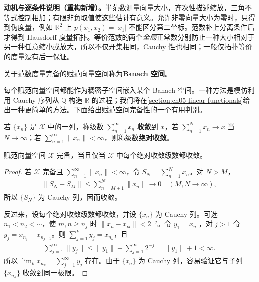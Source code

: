 \documentclass[../../main.tex]{subfiles}
\begin{document}
\begin{remark}
\textbf{动机与逐条件说明（重构新增）。}半范数测量向量大小，齐次性描述缩放，三角不等式控制相加；有限非负取值使这些估计有意义。允许非零向量大小为零时，只得到伪度量，例如 $\mathbb R^2$ 上 $p(x_1,x_2)=|x_1|$ 不能区分第二坐标。范数补上分离条件后才得到 Hausdorff 度量拓扑。等价范数的两个\emph{全局}正常数分别防止一种大小相对于另一种任意缩小或放大，所以不仅开集相同，Cauchy 性也相同；一般仅拓扑等价的度量没有后一保证。
\end{remark}
\begin{definition}[Banach 空间]\label{definition:ch05-banach-space}
关于范数度量完备的赋范向量空间称为\textbf{Banach 空间}。
\end{definition}
每个赋范向量空间都能作为稠密子空间嵌入某个 Banach 空间。一种方法是模仿利用 Cauchy 序列从 $\mathbb Q$ 构造 $\mathbb R$ 的过程；我们将在\cref{section:ch05-linear-functionals}给出一种更简单的方法。下面给出赋范空间完备性的一个有用判别。
\begin{definition}[向量级数的收敛与绝对收敛]\label{definition:ch05-series-convergence}
若 $\{x_n\}$ 是 $\mathcal X$ 中的一列，称级数 $\sum_{n=1}^{\infty}x_n$ \textbf{收敛}到 $x$，若 $\sum_{n=1}^Nx_n\to x$ 当 $N\to\infty$；若 $\sum_{n=1}^{\infty}\|x_n\|<\infty$，则称级数\textbf{绝对收敛}。
\end{definition}
\begin{theorem}\label{theorem:ch05-banach-series-criterion}
赋范向量空间 $\mathcal X$ 完备，当且仅当 $\mathcal X$ 中每个绝对收敛级数都收敛。
\end{theorem}
\begin{proof}
若 $\mathcal X$ 完备且 $\sum_{n=1}^{\infty}\|x_n\|<\infty$，令 $S_N=\sum_{n=1}^Nx_n$。对 $N>M$，
\begin{align*}
\|S_N-S_M\|\le\sum_{n=M+1}^N\|x_n\|\longrightarrow0\quad(M,N\to\infty),
\end{align*}
所以 $\{S_N\}$ 为 Cauchy 列，因而收敛。

反过来，设每个绝对收敛级数都收敛，并设 $\{x_n\}$ 为 Cauchy 列。可选 $n_1<n_2<\cdots$，使 $m,n\ge n_j$ 时 $\|x_n-x_m\|<2^{-j}$。令 $y_1=x_{n_1}$，对 $j>1$ 令 $y_j=x_{n_j}-x_{n_{j-1}}$。则 $\sum_{j=1}^ky_j=x_{n_k}$，且
\begin{align*}
\sum_{j=1}^{\infty}\|y_j\|\le\|y_1\|+\sum_{j=1}^{\infty}2^{-j}=\|y_1\|+1<\infty.
\end{align*}
所以 $\lim_kx_{n_k}=\sum_{j=1}^{\infty}y_j$ 存在。由于 $\{x_n\}$ 为 Cauchy 列，容易验证它与子列 $\{x_{n_k}\}$ 收敛到同一极限。
\end{proof}
\end{document}
